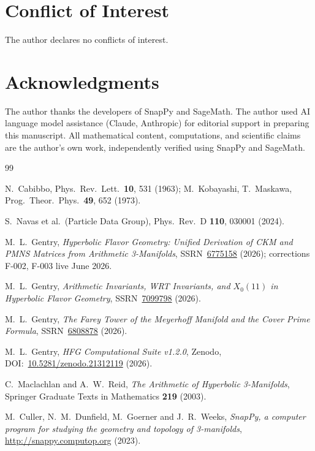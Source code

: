 \documentclass[11pt,a4paper]{article}
\theoremstyle{remark}
\begin{document}
\section*{Conflict of Interest}
The author declares no conflicts of interest.

\section*{Acknowledgments}
The author thanks the developers of SnapPy and SageMath.
The author used AI language model assistance (Claude, Anthropic) for
editorial support in preparing this manuscript. All mathematical content,
computations, and scientific claims are the author's own work,
independently verified using SnapPy and SageMath.

\begin{thebibliography}{99}

  N.~Cabibbo, Phys.\ Rev.\ Lett.\ \textbf{10}, 531 (1963);
  M.~Kobayashi, T.~Maskawa, Prog.\ Theor.\ Phys.\ \textbf{49}, 652 (1973).

  S.~Navas et al.\ (Particle Data Group),
  Phys.\ Rev.\ D \textbf{110}, 030001 (2024).

  M.~L.~Gentry,
  \textit{Hyperbolic Flavor Geometry: Unified Derivation of CKM and PMNS
  Matrices from Arithmetic 3-Manifolds},
  SSRN~\href{https://doi.org/10.2139/ssrn.6775158}{6775158} (2026);
  corrections F-002, F-003 live June 2026.

  M.~L.~Gentry,
  \textit{Arithmetic Invariants, WRT Invariants, and $X_0(11)$ in
  Hyperbolic Flavor Geometry},
  SSRN~\href{https://doi.org/10.2139/ssrn.7099798}{7099798} (2026).

  M.~L.~Gentry,
  \textit{The Farey Tower of the Meyerhoff Manifold and the Cover
  Prime Formula},
  SSRN~\href{https://doi.org/10.2139/ssrn.6808878}{6808878} (2026).

  M.~L.~Gentry,
  \textit{HFG Computational Suite v1.2.0},
  Zenodo, DOI:~\href{https://doi.org/10.5281/zenodo.21312119}{10.5281/zenodo.21312119}
  (2026).

  C.~Maclachlan and A.~W.~Reid,
  \emph{The Arithmetic of Hyperbolic 3-Manifolds},
  Springer Graduate Texts in Mathematics \textbf{219} (2003).

  M.~Culler, N.~M.~Dunfield, M.~Goerner and J.~R.~Weeks,
  \textit{SnapPy, a computer program for studying the geometry and
  topology of 3-manifolds},
  \url{http://snappy.computop.org} (2023).

\end{thebibliography}
\end{document}
